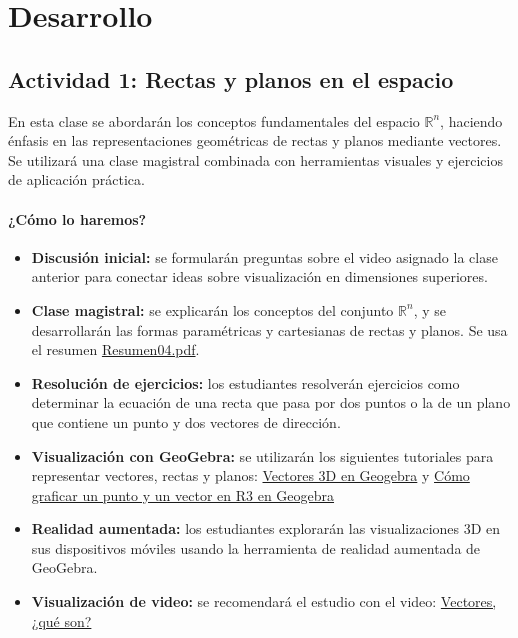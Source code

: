 \documentclass[a4,11pt]{aleph-notas}
\begin{document}
\section*{Desarrollo}  

\subsection*{Actividad 1: Rectas y planos en el espacio}

En esta clase se abordarán los conceptos fundamentales del espacio \(\mathbb{R}^n\), haciendo énfasis en las representaciones geométricas de rectas y planos mediante vectores. Se utilizará una clase magistral combinada con herramientas visuales y ejercicios de aplicación práctica.

\paragraph{¿Cómo lo haremos?}  
\begin{itemize}[leftmargin=*]
    \item \textbf{Discusión inicial:} se formularán preguntas sobre el video asignado la clase anterior para conectar ideas sobre visualización en dimensiones superiores.
    \item \textbf{Clase magistral:} se explicarán los conceptos del conjunto \(\mathbb{R}^n\), y se desarrollarán las formas paramétricas y cartesianas de rectas y planos. Se usa el resumen \href{https://fcena-puce.github.io/AlgLinealyGeomAnalitica-05-N0068/2-Resumenes/Resumen04.pdf}{Resumen04.pdf}.
    \item \textbf{Resolución de ejercicios:} los estudiantes resolverán ejercicios como determinar la ecuación de una recta que pasa por dos puntos o la de un plano que contiene un punto y dos vectores de dirección.
    \item \textbf{Visualización con GeoGebra:} se utilizarán los siguientes tutoriales para representar vectores, rectas y planos:  
    \href{https://www.youtube.com/watch?v=GJYpYoUI104}{Vectores 3D en Geogebra} y
    \href{https://www.youtube.com/shorts/HRGo8-waS9E}{Cómo graficar un punto y un vector en R3  en Geogebra}  
    \item \textbf{Realidad aumentada:} los estudiantes explorarán las visualizaciones 3D en sus dispositivos móviles usando la herramienta de realidad aumentada de GeoGebra.
    \item \textbf{Visualización de video:} se recomendará el estudio con el video: \href{https://youtu.be/wiuEEkP_XuM?si=7Fk0XK8RBzKr8Qtg}{Vectores, ¿qué son?}
\end{itemize}
\end{document}
